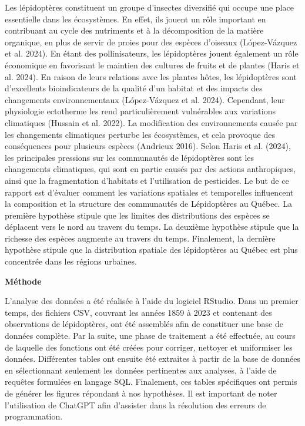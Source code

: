 \documentclass[9pt,twocolumn,twoside,]{pnas-new}
\begin{document}
Les lépidoptères constituent un groupe d'insectes diversifié qui occupe
une place essentielle dans les écosystèmes. En effet, ils jouent un rôle
important en contribuant au cycle des nutriments et à la décomposition
de la matière organique, en plus de servir de proies pour des espèces
d'oiseaux (López-Vázquez et al. 2024). En étant des pollinisateurs, les
lépidoptères jouent également un rôle économique en favorisant le
maintien des cultures de fruits et de plantes (Haris et al. 2024). En
raison de leurs relations avec les plantes hôtes, les lépidoptères sont
d'excellents bioindicateurs de la qualité d'un habitat et des impacts
des changements environnementaux (López-Vázquez et al. 2024). Cependant,
leur physiologie ectotherme les rend particulièrement vulnérables aux
variations climatiques (Hussain et al. 2022). La modification des
environnements causée par les changements climatiques perturbe les
écosystèmes, et cela provoque des conséquences pour plusieurs espèces
(Andrieux 2016). Selon Haris et al. (2024), les principales pressions
sur les communautés de lépidoptères sont les changements climatiques,
qui sont en partie causés par des actions anthropiques, ainsi que la
fragmentation d'habitats et l'utilisation de pesticides. Le but de ce
rapport est d'évaluer comment les variations spatiales et temporelles
influencent la composition et la structure des communautés de
Lépidoptères au Québec. La première hypothèse stipule que les limites
des distributions des espèces se déplacent vers le nord au travers du
temps. La deuxième hypothèse stipule que la richesse des espèces
augmente au travers du temps. Finalement, la dernière hypothèse stipule
que la distribution spatiale des lépidoptères au Québec est plus
concentrée dans les régions urbaines.

\textbf{Méthode}

L'analyse des données a été réalisée à l'aide du logiciel RStudio. Dans
un premier temps, des fichiers CSV, couvrant les années 1859 à 2023 et
contenant des observations de lépidoptères, ont été assemblés afin de
constituer une base de données complète. Par la suite, une phase de
traitement a été effectuée, au cours de laquelle des fonctions ont été
créées pour corriger, nettoyer et uniformiser les données. Différentes
tables ont ensuite été extraites à partir de la base de données en
sélectionnant seulement les données pertinentes aux analyses, à l'aide
de requêtes formulées en langage SQL. Finalement, ces tables spécifiques
ont permis de générer les figures répondant à nos hypothèses. Il est
important de noter l'utilisation de ChatGPT afin d'assister dans la
résolution des erreurs de programmation.
\end{document}
